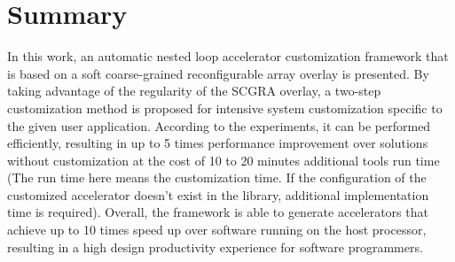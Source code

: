 \section{Summary}
In this work, an automatic nested loop accelerator customization framework that is based on a soft coarse-grained reconfigurable array overlay is presented. By taking advantage of the regularity of the SCGRA overlay, a two-step customization method is proposed for intensive system customization specific to the given user application. According to the experiments, it can be performed efficiently, resulting in up to \num{5} times performance improvement over solutions without customization at the cost of \num{10} to \num{20} minutes additional tools run time (The run time here means the customization time. If the configuration of the customized accelerator doesn't exist in the library, additional implementation time is required). Overall, the framework is able to generate accelerators that achieve up to \num{10} times speed up over software running on the host processor, resulting in a high design productivity experience for software programmers.
